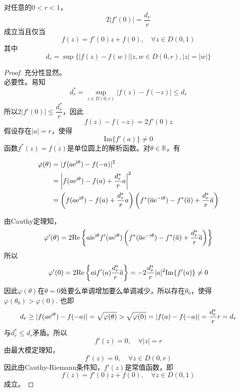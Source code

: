 \begin{theorem}\label{theorem:complex}

    对任意的$0 < r < 1$，
    $$2|f'(0)| = \dfrac{d_r}{r}$$
    成立当且仅当
    $$f(z) = f'(0)z + f(0), \quad \forall z \in D(0, 1)$$
    其中
    $$d_r = \sup\{|f(z) - f(w)|\big| z, w \in D(0, r), |z| = |w|\}$$
    
\end{theorem}

\begin{proof}
    
    充分性显然。\\
    必要性。易知
    $$d_r^{*} = \sup\limits_{z \in D(0, r)}{|f(z) - f(-z)|} \leq d_r$$
    所以$2|f'(0)| \leq \dfrac{d_r^{*}}{r}$，因此
    $$f(z) - f(-z) = 2f'(0)z$$
    假设存在$|a| = r$，使得
    $$\mathrm{Im}\{f'(a)\} \neq 0$$
    函数$f^{*}(z) = \overline{f(\overline{z})}$是单位圆上的解析函数。对$\theta \in \mathbb{R}$，有

    \begin{align*}
        \varphi(\theta) & = |f(a\mathrm{e}^{\mathrm{i} \theta}) - f(-a)|^2 \\
        & = \left| f(a\mathrm{e}^{\mathrm{i} \theta}) - f(a) + \dfrac{d_r^{*}}{r}a \right|^2 \\
        & = \left( f(a\mathrm{e}^{\mathrm{i} \theta}) - f(a) + \dfrac{d_r^{*}}{r}a \right) \left( f^{*}(\overline{a}\mathrm{e}^{-\mathrm{i} \theta}) - f^{*}(\overline{a}) + \dfrac{d_r^{*}}{r}\overline{a} \right)
    \end{align*}

    由\textup{Cauthy}定理知，
    $$\varphi'(\theta) = 2 \mathrm{Re}\left\{ a\mathrm{i} \mathrm{e}^{\mathrm{i} \theta}f'(a\mathrm{e}^{\mathrm{i} \theta}) \left( f^{*}(\overline{a}\mathrm{e}^{-\mathrm{i} \theta}) - f^{*}(\overline{a}) + \dfrac{d_r^{*}}{r}\overline{a} \right) \right\}$$
    所以
    $$\varphi'(0) = 2 \mathrm{Re}\left\{ a\mathrm{i} f'(a)\dfrac{d_r^{*}}{r}\overline{a} \right\} = -2\dfrac{d_r^{*}}{r}|a|^2\mathrm{Im}\{f'(a)\} \neq 0$$
    因此$\varphi(\theta)$在$\theta = 0$处要么单调增加要么单调减少，所以存在$\theta_0$，使得$\varphi(\theta_0) > \varphi(0)$. 也即
    $$d_r \geq |f(a\mathrm{e}^{\mathrm{i} \theta}) - f(-a)| = \sqrt{\varphi(\theta)} > \sqrt{\varphi(0)} = |f(a) - f(-a)| = \dfrac{d_r^{*}}{r}r = d_r$$
    与$d_r^{*} \leq d_r$矛盾。所以
    $$f'(z) = 0, \quad \forall |z| = r$$
    由最大模定理知，
    $$f'(z) = 0, \quad \forall z \in D(0, r)$$
    因此由\textup{Cauthy-Riemann}条件知，$f'(z)$是常值函数，即
    $$f(z) = f'(0)z + f(0), \quad \forall z \in D(0, 1)$$
    成立。
    
\end{proof}


